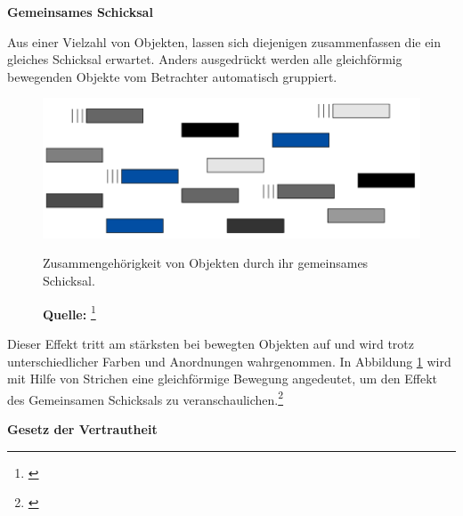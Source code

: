 \textbf{Gemeinsames Schicksal}

Aus einer Vielzahl von Objekten, lassen sich diejenigen zusammenfassen die ein gleiches Schicksal erwartet. Anders ausgedrückt werden alle gleichförmig bewegenden Objekte vom Betrachter automatisch gruppiert.
\begin{figure}[H]
  \centering
  \includegraphics[scale=1]{img/gesetz_des_gemeinsamen_Schicksals.PNG}
  \caption{Zusammengehörigkeit von Objekten durch ihr gemeinsames Schicksal.}
    \caption*{\textbf{Quelle:} \footnote{\cite{Dahm2006}}}
  \label{fig:gemeinsamesSchicksal}
\end{figure}
Dieser Effekt tritt am stärksten bei bewegten Objekten auf und wird trotz unterschiedlicher Farben und Anordnungen wahrgenommen. In Abbildung \ref{fig:gemeinsamesSchicksal} wird mit Hilfe von Strichen eine gleichförmige Bewegung angedeutet, um den Effekt des \glqq Gemeinsamen Schicksals\grqq{} zu veranschaulichen.\footnote{\cite[vgl.][62]{Dahm2006}}

\textbf{Gesetz der Vertrautheit}

